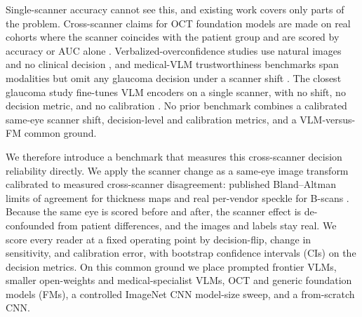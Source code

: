 Single-scanner accuracy cannot see this, and existing work covers only parts of the problem.
Cross-scanner claims for OCT foundation models are made on real cohorts where the scanner coincides with the patient group and are scored by
accuracy or AUC alone \citep{zhou2023retfound, liu2024octcubem, morano2025mirage}. Verbalized-overconfidence studies
use natural images and no clinical decision \citep{groot2024overconfidence}, and medical-VLM trustworthiness
benchmarks span modalities but omit any glaucoma decision under a scanner shift \citep{xia2024cares}. The closest glaucoma
study fine-tunes VLM encoders on a single scanner, with no shift, no decision metric, and no calibration
\citep{jalili2025tvst}. No prior benchmark combines a calibrated same-eye scanner shift, decision-level and
calibration metrics, and a VLM-versus-FM common ground.

We therefore introduce a benchmark that measures this cross-scanner decision reliability directly. We apply the scanner change
as a same-eye image transform calibrated to measured cross-scanner disagreement: published Bland--Altman limits of
agreement for thickness maps \citep{warner2011loa, blandaltman1986} and real per-vendor speckle for B-scans
\citep{schmitt1999speckle, bogunovic2019retouch}. Because the same eye is scored before and after, the scanner effect
is de-confounded from patient differences, and the images and labels stay real. We score
every reader at a fixed operating point by decision-flip, change in sensitivity, and calibration error, with
bootstrap confidence intervals (CIs) on the decision metrics. On this common ground we place prompted frontier VLMs, smaller open-weights and
medical-specialist VLMs, OCT and generic foundation models (FMs), a controlled ImageNet CNN model-size sweep, and a
from-scratch CNN.

